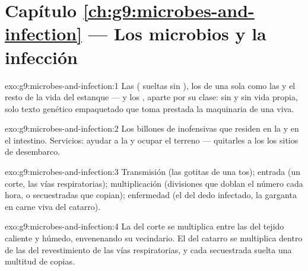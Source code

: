 \section*{Capítulo \ref{ch:g9:microbes-and-infection} --- Los microbios y la infección}

\begin{solution}{exo:g9:microbes-and-infection:1}
Las  ( sueltas sin ), los  de una sola
 como las  y el resto de la vida  del estanque
--- y los , aparte por su clase: sin  y sin vida propia,
solo texto genético empaquetado que toma prestada la maquinaria de una
 viva.
\end{solution}

\begin{solution}{exo:g9:microbes-and-infection:2}
Los billones de  inofensivas que residen en la  y en el
intestino. Servicios: ayudar a la  y ocupar el terreno ---
quitarles a los  los sitios de desembarco.
\end{solution}

\begin{solution}{exo:g9:microbes-and-infection:3}
Transmisión (las gotitas de una tos); entrada (un corte, las vías
respiratorias); multiplicación (divisiones que doblan el número cada
hora, o  secuestradas que copian); enfermedad (el  del
dedo infectado, la garganta en carne viva del catarro).
\end{solution}

\begin{solution}{exo:g9:microbes-and-infection:4}
La  del corte se multiplica entre las  del tejido
caliente y húmedo, envenenando su vecindario. El  del catarro se
multiplica dentro de las  del revestimiento de las vías
respiratorias, y cada  secuestrada suelta una multitud de copias.
\end{solution}

